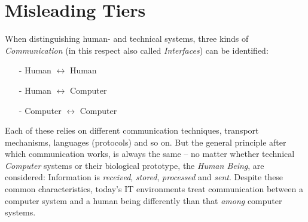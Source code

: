 %
%
%
%
%
%
%

\section{Misleading Tiers}
\label{misleading_tiers_heading}

When distinguishing human- and technical systems, three kinds of
\emph{Communication} (in this respect also called \emph{Interfaces}) can be
identified:

\begin{itemize}
    \item[-] Human $\leftrightarrow$ Human
    \item[-] Human $\leftrightarrow$ Computer
    \item[-] Computer $\leftrightarrow$ Computer
\end{itemize}

Each of these relies on different communication techniques, transport
mechanisms, languages (protocols) and so on. But the general principle after
which communication works, is always the same -- no matter whether technical
\emph{Computer} systems or their biological prototype, the \emph{Human Being},
are considered: Information is \emph{received}, \emph{stored}, \emph{processed}
and \emph{sent}. Despite these common characteristics, today's IT environments
treat communication between a computer system and a human being differently than
that \emph{among} computer systems.

